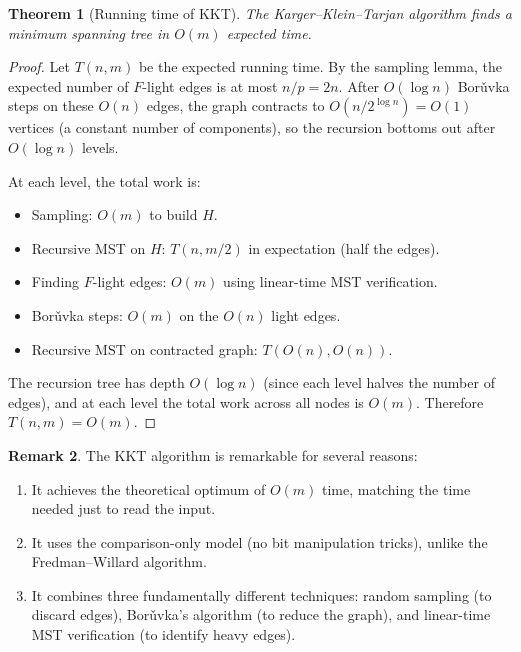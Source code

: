 \documentclass[twoside,12pt]{book}
\theoremstyle{plain}
\newtheorem{theorem}{Theorem}[chapter]
\theoremstyle{definition}
\newtheorem{remark}[theorem]{Remark}
\theoremstyle{remark}
\begin{document}
\begin{theorem}[Running time of KKT]
\label{thm:kkt}
The Karger--Klein--Tarjan algorithm finds a minimum spanning tree in $O(m)$ expected time.
\end{theorem}

\begin{proof}
Let $T(n, m)$ be the expected running time. By the sampling lemma, the expected number of $F$-light edges is at most $n/p = 2n$. After $O(\log n)$ Bor\v{u}vka steps on these $O(n)$ edges, the graph contracts to $O(n / 2^{\log n}) = O(1)$ vertices (a constant number of components), so the recursion bottoms out after $O(\log n)$ levels.

At each level, the total work is:
\begin{itemize}[nosep]
    \item Sampling: $O(m)$ to build $H$.
    \item Recursive MST on $H$: $T(n, m/2)$ in expectation (half the edges).
    \item Finding $F$-light edges: $O(m)$ using linear-time MST verification.
    \item Bor\v{u}vka steps: $O(m)$ on the $O(n)$ light edges.
    \item Recursive MST on contracted graph: $T(O(n), O(n))$.
\end{itemize}

The recursion tree has depth $O(\log n)$ (since each level halves the number of edges), and at each level the total work across all nodes is $O(m)$. Therefore $T(n, m) = O(m)$.
\end{proof}

\begin{remark}
The KKT algorithm is remarkable for several reasons:
\begin{enumerate}[nosep]
    \item It achieves the theoretical optimum of $O(m)$ time, matching the time needed just to read the input.
    \item It uses the comparison-only model (no bit manipulation tricks), unlike the Fredman--Willard algorithm.
    \item It combines three fundamentally different techniques: random sampling (to discard edges), Bor\v{u}vka's algorithm (to reduce the graph), and linear-time MST verification (to identify heavy edges).
\end{enumerate}
\end{remark}


\end{document}
